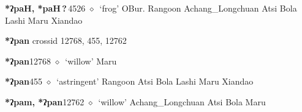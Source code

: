   \begin{list}{}{\leftmargin=1.5em \itemindent=-1.5em}
  \item {\footnotesize \textbf{*ʔpaH, *paH\,?\,}}{\tiny 4526}
         $\diamond$~`frog'
         OBur. 
\hspace{1ex}
         Rangoon 
\hspace{1ex}
         Achang\_Longchuan 
\hspace{1ex}
         Atsi 
\hspace{1ex}
         Bola 
\hspace{1ex}
         Lashi 
\hspace{1ex}
         Maru 
\hspace{1ex}
         Xiandao 
  \end{list}
\item
\textbf{*ʔpan}
  {\tiny crossid 12768, 455, 12762}
  \begin{list}{}{\leftmargin=1.5em \itemindent=-1.5em}
  \item {\footnotesize \textbf{*ʔpan}}{\tiny 12768}
         $\diamond$~`willow'
         Maru 
  \item {\footnotesize \textbf{*ʔpan}}{\tiny 455}
\hspace{1ex}
         $\diamond$~`astringent'
         Rangoon 
\hspace{1ex}
         Atsi 
\hspace{1ex}
         Bola 
\hspace{1ex}
         Lashi 
\hspace{1ex}
         Maru 
\hspace{1ex}
         Xiandao 
  \item {\footnotesize \textbf{*ʔpam, *ʔpan}}{\tiny 12762}
\hspace{1ex}
         $\diamond$~`willow'
         Achang\_Longchuan 
\hspace{1ex}
         Atsi 
\hspace{1ex}
         Bola 
\hspace{1ex}
         Maru 
  \end{list}
